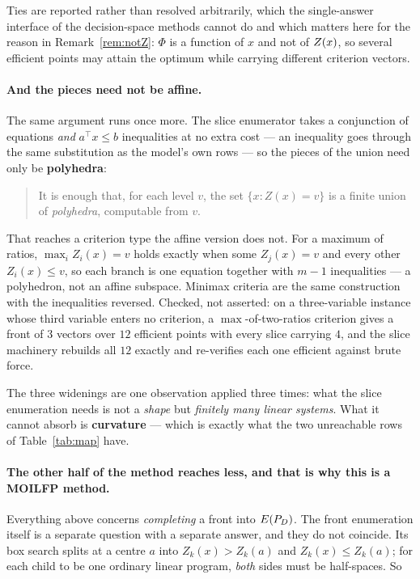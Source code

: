 \documentclass[11pt,a4paper]{article}
\begin{document}
Ties are reported rather than resolved arbitrarily, which the single-answer
interface of the decision-space methods cannot do and which matters here for
the reason in Remark~\ref{rem:notZ}: $\Phi$ is a function of $x$ and not of
$Z(x)$, so several efficient points may attain the optimum while carrying
different criterion vectors.

\paragraph{And the pieces need not be affine.}
The same argument runs once more.  The slice enumerator takes a conjunction of
equations \emph{and} $a^{\top}x \leqslant b$ inequalities at no extra cost ---
an inequality goes through the same substitution as the model's own rows --- so
the pieces of the union need only be \textbf{polyhedra}:

\begin{quote}
It is enough that, for each level $v$, the set $\{x : Z(x) = v\}$ is a finite
union of \emph{polyhedra}, computable from $v$.
\end{quote}

\noindent
That reaches a criterion type the affine version does not.  For a maximum of
ratios, $\max_i Z_i(x) = v$ holds exactly when some $Z_j(x) = v$ and every
other $Z_i(x) \leqslant v$, so each branch is one equation together with $m-1$
inequalities --- a polyhedron, not an affine subspace.  Minimax criteria are
the same construction with the inequalities reversed.  Checked, not asserted:
on a three-variable instance whose third variable enters no criterion, a
$\max$-of-two-ratios criterion gives a front of $3$ vectors over $12$ efficient
points with every slice carrying $4$, and the slice machinery rebuilds all $12$
exactly and re-verifies each one efficient against brute force.

The three widenings are one observation applied three times: what the slice
enumeration needs is not a \emph{shape} but \emph{finitely many linear
systems}.  What it cannot absorb is \textbf{curvature} --- which is exactly
what the two unreachable rows of Table~\ref{tab:map} have.

\paragraph{The other half of the method reaches less, and that is why this is a
MOILFP method.}
Everything above concerns \emph{completing} a front into $E(P_{D})$.  The front
enumeration itself is a separate question with a separate answer, and they do
not coincide.  Its box search splits at a centre $a$ into $Z_k(x) > Z_k(a)$ and
$Z_k(x) \leqslant Z_k(a)$; for each child to be one ordinary linear program,
\emph{both} sides must be half-spaces.  So
\end{document}
